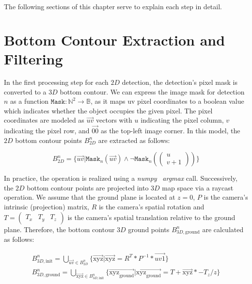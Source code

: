 The following sections of this chapter serve to explain each step in detail.


\section{Bottom Contour Extraction and Filtering}
\label{sec:botcont}

In the first processing step for each $2D$ detection, the detection's pixel mask is converted to a $3D$ bottom contour.
We can express the image mask for detection $n$ as a function $\mathtt{Mask}: \mathbb{N}^2 \rightarrow \mathbb{B}$, as it maps uv pixel coordinates to a boolean value which indicates whether the object occupies the given pixel.
The pixel coordinates are modeled as $\overrightarrow{uv}$ vectors with $u$ indicating the pixel column, $v$ indicating the pixel row, and $\overrightarrow{00}$ as the top-left image corner.
In this model, the $2D$ bottom contour points $B^n_{2D}$ are extracted as follows:

\[
    B^n_{2D}=\{\overrightarrow{uv}|\mathtt{Mask}_n(\overrightarrow{uv}) \land \neg \mathtt{Mask}_n( \begin{pmatrix}u\\v+1\end{pmatrix}) \}
\]

In practice, the operation is realized using a \textit{numpy}~\cite{harris2020array} \textit{argmax} call.
Successively, the $2D$ bottom contour points are projected into $3D$ map space via a raycast operation.
We assume that the ground plane is located at $z=0$, $P$ is the camera's intrinsic (projection) matrix, $R$ is the camera's spatial rotation and $T=\begin{pmatrix} T_x & T_y & T_z \end{pmatrix}$ is the camera's spatial translation relative to the ground plane.
Therefore, the bottom contour $3D$ ground points $B^n_{3D,\text{ground}}$ are calculated as follows:

\begin{gather*}
    B^n_{3D,\text{init}}=\bigcup_{\overrightarrow{uv} \in B^n_{2D}} \{\overrightarrow{\text{xyz}} | \overrightarrow{\text{xyz}} = R^T * P^{-1} * \overrightarrow{uv1}\}\\
    B^n_{3D,\text{ground}}=\bigcup_{\overrightarrow{\text{xyz}} \in B^n_{3D,\text{init}}} \{\overrightarrow{\text{xyz}_\text{ground}} | \overrightarrow{\text{xyz}_\text{ground}} = T + \overrightarrow{\text{xyz}} * -T_z/z\}\\
\end{gather*}

